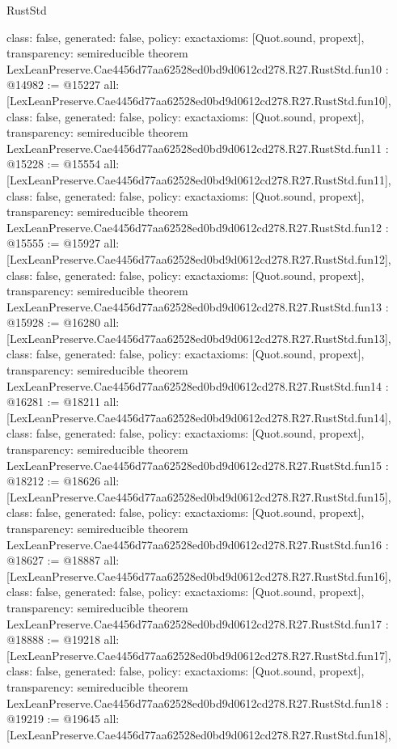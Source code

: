 \begin{lexlean}{RustStd}
\begin{coremodule}
{  class: false,
  generated: false,
  policy: exact{axioms: [Quot.sound, propext]},
  transparency: semireducible
}
theorem LexLeanPreserve.Cae4456d77aa62528ed0bd9d0612cd278.R27.RustStd.fun10 : @14982 := @15227 {
  all: [LexLeanPreserve.Cae4456d77aa62528ed0bd9d0612cd278.R27.RustStd.fun10],
  class: false,
  generated: false,
  policy: exact{axioms: [Quot.sound, propext]},
  transparency: semireducible
}
theorem LexLeanPreserve.Cae4456d77aa62528ed0bd9d0612cd278.R27.RustStd.fun11 : @15228 := @15554 {
  all: [LexLeanPreserve.Cae4456d77aa62528ed0bd9d0612cd278.R27.RustStd.fun11],
  class: false,
  generated: false,
  policy: exact{axioms: [Quot.sound, propext]},
  transparency: semireducible
}
theorem LexLeanPreserve.Cae4456d77aa62528ed0bd9d0612cd278.R27.RustStd.fun12 : @15555 := @15927 {
  all: [LexLeanPreserve.Cae4456d77aa62528ed0bd9d0612cd278.R27.RustStd.fun12],
  class: false,
  generated: false,
  policy: exact{axioms: [Quot.sound, propext]},
  transparency: semireducible
}
theorem LexLeanPreserve.Cae4456d77aa62528ed0bd9d0612cd278.R27.RustStd.fun13 : @15928 := @16280 {
  all: [LexLeanPreserve.Cae4456d77aa62528ed0bd9d0612cd278.R27.RustStd.fun13],
  class: false,
  generated: false,
  policy: exact{axioms: [Quot.sound, propext]},
  transparency: semireducible
}
theorem LexLeanPreserve.Cae4456d77aa62528ed0bd9d0612cd278.R27.RustStd.fun14 : @16281 := @18211 {
  all: [LexLeanPreserve.Cae4456d77aa62528ed0bd9d0612cd278.R27.RustStd.fun14],
  class: false,
  generated: false,
  policy: exact{axioms: [Quot.sound, propext]},
  transparency: semireducible
}
theorem LexLeanPreserve.Cae4456d77aa62528ed0bd9d0612cd278.R27.RustStd.fun15 : @18212 := @18626 {
  all: [LexLeanPreserve.Cae4456d77aa62528ed0bd9d0612cd278.R27.RustStd.fun15],
  class: false,
  generated: false,
  policy: exact{axioms: [Quot.sound, propext]},
  transparency: semireducible
}
theorem LexLeanPreserve.Cae4456d77aa62528ed0bd9d0612cd278.R27.RustStd.fun16 : @18627 := @18887 {
  all: [LexLeanPreserve.Cae4456d77aa62528ed0bd9d0612cd278.R27.RustStd.fun16],
  class: false,
  generated: false,
  policy: exact{axioms: [Quot.sound, propext]},
  transparency: semireducible
}
theorem LexLeanPreserve.Cae4456d77aa62528ed0bd9d0612cd278.R27.RustStd.fun17 : @18888 := @19218 {
  all: [LexLeanPreserve.Cae4456d77aa62528ed0bd9d0612cd278.R27.RustStd.fun17],
  class: false,
  generated: false,
  policy: exact{axioms: [Quot.sound, propext]},
  transparency: semireducible
}
theorem LexLeanPreserve.Cae4456d77aa62528ed0bd9d0612cd278.R27.RustStd.fun18 : @19219 := @19645 {
  all: [LexLeanPreserve.Cae4456d77aa62528ed0bd9d0612cd278.R27.RustStd.fun18],
}
\end{coremodule}
\end{lexlean}
